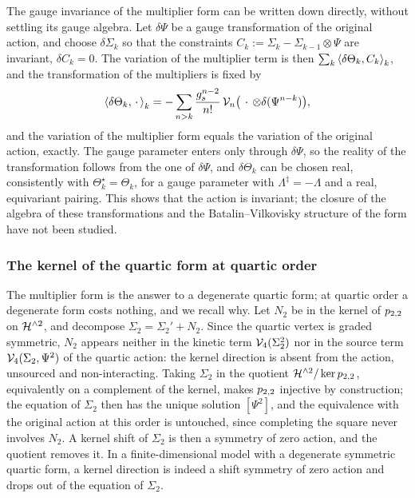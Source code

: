 The gauge invariance of the multiplier form can be written down directly, without settling its gauge algebra.
Let $\delta \Psi$ be a gauge transformation of the original action, and choose $\delta \Sigma_k$ so that the constraints $C_k := \Sigma_k - \Sigma_{k - 1} \otimes \Psi$ are invariant, $\delta C_k = 0$.
The variation of the multiplier term is then $\sum_k \pair[k]{\delta \Theta_k}{C_k}$, and the transformation of the multipliers is fixed by
\begin{equation}
  \label{eq:mult:gauge-multiplier}
  \pair[k]{\delta \Theta_k}{\,\cdot\,}
    = - \sum_{n > k} \frac{\gs^{n - 2}}{n!} \, \vertex{n}\big( \,\cdot\, \otimes \delta(\Psi^{n - k}) \big),
\end{equation}
and the variation of the multiplier form equals the variation of the original action, exactly.
The gauge parameter enters only through $\delta \Psi$, so the reality of the transformation follows from the one of $\delta \Psi$, and $\delta \Theta_k$ can be chosen real, consistently with $\Theta_k^\star = \Theta_k$, for a gauge parameter with $\Lambda^\ddagger = - \Lambda$ and a real, equivariant pairing.
This shows that the action is invariant; the closure of the algebra of these transformations and the Batalin--Vilkovisky structure of the form have not been studied.

\subsubsection{The kernel of the quartic form at quartic order}
\label{sec:mult:kernel-decoupling}

The multiplier form is the answer to a degenerate quartic form; at quartic order a degenerate form costs nothing, and we recall why.
Let $N_2$ be in the kernel of $\sprod{2}{2}$ on $\Hn{2}$, and decompose $\Sigma_2 = \Sigma_2' + N_2$.
Since the quartic vertex is graded symmetric, $N_2$ appears neither in the kinetic term $\vertex{4}(\Sigma_2^2)$ nor in the source term $\vertex{4}(\Sigma_2, \Psi^2)$ of the quartic action: the kernel direction is absent from the action, unsourced and non-interacting.
Taking $\Sigma_2$ in the quotient $\Hn{2} / \ker \sprod{2}{2}$, equivalently on a complement of the kernel, makes $\sprod{2}{2}$ injective by construction; the equation of $\Sigma_2$ then has the unique solution $[\Psi^2]$, and the equivalence with the original action at this order is untouched, since completing the square never involves $N_2$.
A kernel shift of $\Sigma_2$ is then a symmetry of zero action, and the quotient removes it.
In a finite-dimensional model with a degenerate symmetric quartic form, a kernel direction is indeed a shift symmetry of zero action and drops out of the equation of $\Sigma_2$.


